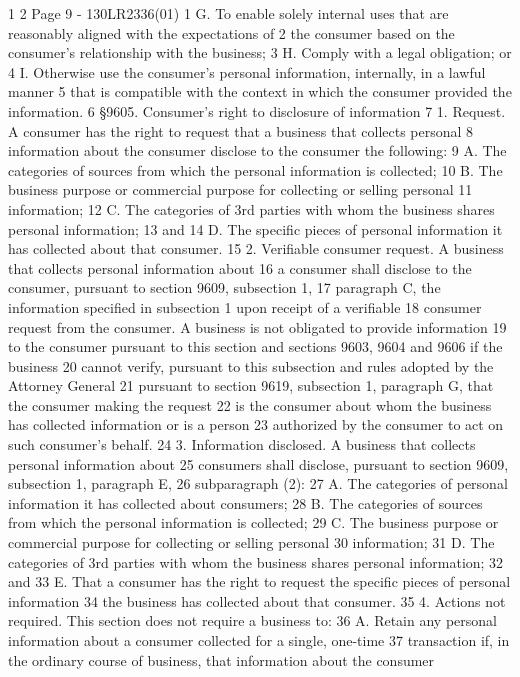 1
2
Page 9 - 130LR2336(01)
1 G. To enable solely internal uses that are reasonably aligned with the expectations of
2 the consumer based on the consumer's relationship with the business;
3 H. Comply with a legal obligation; or
4 I. Otherwise use the consumer's personal information, internally, in a lawful manner
5 that is compatible with the context in which the consumer provided the information.
6 §9605. Consumer's right to disclosure of information
7 1. Request. A consumer has the right to request that a business that collects personal
8 information about the consumer disclose to the consumer the following:
9 A. The categories of sources from which the personal information is collected;
10 B. The business purpose or commercial purpose for collecting or selling personal
11 information;
12 C. The categories of 3rd parties with whom the business shares personal information;
13 and
14 D. The specific pieces of personal information it has collected about that consumer.
15 2. Verifiable consumer request. A business that collects personal information about
16 a consumer shall disclose to the consumer, pursuant to section 9609, subsection 1,
17 paragraph C, the information specified in subsection 1 upon receipt of a verifiable
18 consumer request from the consumer. A business is not obligated to provide information
19 to the consumer pursuant to this section and sections 9603, 9604 and 9606 if the business
20 cannot verify, pursuant to this subsection and rules adopted by the Attorney General
21 pursuant to section 9619, subsection 1, paragraph G, that the consumer making the request
22 is the consumer about whom the business has collected information or is a person
23 authorized by the consumer to act on such consumer's behalf.
24 3. Information disclosed. A business that collects personal information about
25 consumers shall disclose, pursuant to section 9609, subsection 1, paragraph E,
26 subparagraph (2):
27 A. The categories of personal information it has collected about consumers;
28 B. The categories of sources from which the personal information is collected;
29 C. The business purpose or commercial purpose for collecting or selling personal
30 information;
31 D. The categories of 3rd parties with whom the business shares personal information;
32 and
33 E. That a consumer has the right to request the specific pieces of personal information
34 the business has collected about that consumer.
35 4. Actions not required. This section does not require a business to:
36 A. Retain any personal information about a consumer collected for a single, one-time
37 transaction if, in the ordinary course of business, that information about the consumer
